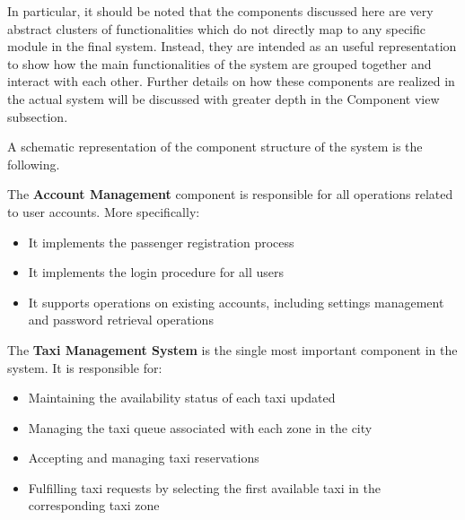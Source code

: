 In particular, it should be noted that the components discussed here are very abstract clusters of functionalities which do not directly map to any specific module in the final system. Instead, they are intended as an useful representation to show how the main functionalities of the system are grouped together and interact with each other. Further details on how these components are realized in the actual system will be discussed with greater depth in the Component view subsection.

A schematic representation of the component structure of the system is the following.
\begin{figure}[H]
\centering
{}
\end{figure}

The \textbf{Account Management} component is responsible for all operations related to user accounts. More specifically:
	\begin{itemize}
		\item It implements the passenger registration process
		\item It implements the login procedure for all users 
		\item It supports operations on existing accounts, including settings management and password retrieval operations
	\end{itemize}

The \textbf{Taxi Management System} is the single most important component in the system. It is responsible for:
	\begin{itemize}
		\item Maintaining the availability status of each taxi updated
		\item Managing the taxi queue associated with each zone in the city
		\item Accepting and managing taxi reservations
		\item Fulfilling taxi requests by selecting the first available taxi in the corresponding taxi zone  
	\end{itemize}
	
